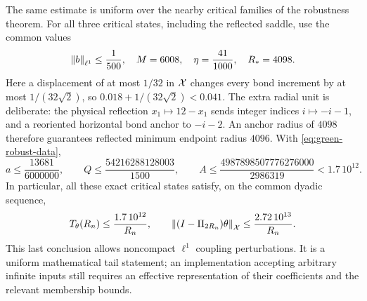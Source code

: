 The same estimate is uniform over the nearby critical families of the
robustness theorem.  For all three critical states, including the reflected
saddle, use the common values
\begin{equation}
 \left\lVert b\right\rVert_{\ell^1}\le\frac1{500},\quad M=6008,\quad
 \eta=\frac{41}{1000},\quad R_*=4098.
 \label{eq:green-robust-data}
\end{equation}
Here a displacement of at most $1/32$ in $\mathcal X$ changes every bond
increment by at most $1/(32\sqrt2)$, so
$0.018+1/(32\sqrt2)<0.041$.  The extra radial unit is deliberate:
the physical reflection $x_1\mapsto12-x_1$ sends integer indices
$i\mapsto-i-1$, and a reoriented horizontal bond anchor to $-i-2$.
An anchor radius of $4098$ therefore guarantees reflected minimum
endpoint radius $4096$.
With \eqref{eq:green-robust-data},
\[
 a\le\frac{13681}{6000000},\qquad
 Q\le\frac{54216288128003}{1500},\qquad
 A\le\frac{4987898507776276000}{2986319}<1.7\,10^{12}.
\]
In particular, all these exact critical states satisfy, on the common
dyadic sequence,
\begin{equation}
 T_\theta(R_n)\le\frac{1.7\,10^{12}}{R_n},\qquad
 \left\lVert(I-\Pi_{2R_n})\theta\right\rVert_\mathcal X
 \le\frac{2.72\,10^{13}}{R_n}.
 \label{eq:green-robust-tail}
\end{equation}
This last conclusion allows noncompact $\ell^1$ coupling perturbations.
It is a uniform mathematical tail statement; an implementation accepting
arbitrary infinite inputs still requires an effective representation of
their coefficients and the relevant membership bounds.
